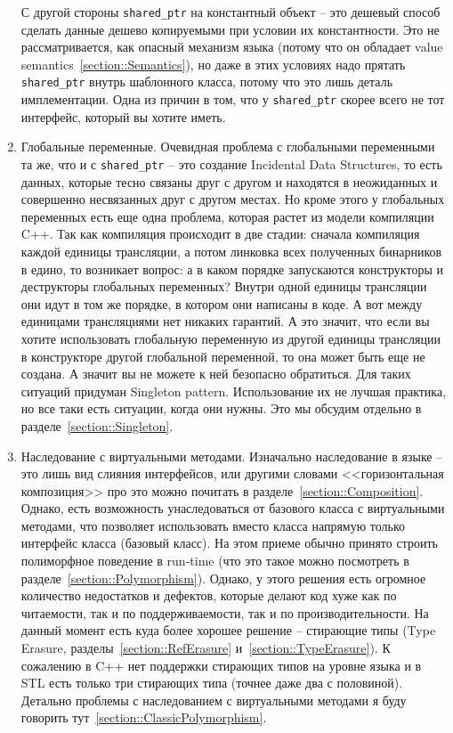 \begin{enumerate}
С другой стороны \verb"shared_ptr" на константный объект -- это дешевый способ сделать данные дешево копируемыми при условии их константности.
Это не рассматривается, как опасный механизм языка (потому что он обладает value semantics~\ref{section::Semantics}), но даже в этих условиях надо прятать \verb"shared_ptr" внутрь шаблонного класса, потому что это лишь деталь имплементации.
Одна из причин в том, что у \verb"shared_ptr" скорее всего не тот интерфейс, который вы хотите иметь.

\item Глобальные переменные.
Очевидная проблема с глобальными переменными та же, что и с \verb"shared_ptr" -- это создание Incidental Data Structures, то есть данных, которые тесно связаны друг с другом и находятся в неожиданных и совершенно несвязанных друг с другом местах.
Но кроме этого у глобальных переменных есть еще одна проблема, которая растет из модели компиляции C++.
Так как компиляция происходит в две стадии: сначала компиляция каждой единицы трансляции, а потом линковка всех полученных бинарников в едино, то возникает вопрос: а в каком порядке запускаются конструкторы и деструкторы глобальных переменных?
Внутри одной единицы трансляции они идут в том же порядке, в котором они написаны в коде.
А вот между единицами трансляциями нет никаких гарантий.
А это значит, что если вы хотите использовать глобальную переменную из другой единицы трансляции в конструкторе другой глобальной переменной, то она может быть еще не создана.
А значит вы не можете к ней безопасно обратиться.
Для таких ситуаций придуман Singleton pattern.
Использование их не лучшая практика, но все таки есть ситуации, когда они нужны.
Это мы обсудим отдельно в разделе~\ref{section::Singleton}.

\item Наследование с виртуальными методами.
Изначально наследование в языке -- это лишь вид слияния интерфейсов, или другими словами <<горизонтальная композиция>> про это можно почитать в разделе~\ref{section::Composition}.
Однако, есть возможность унаследоваться от базового класса с виртуальными методами, что позволяет использовать вместо класса напрямую только интерфейс класса (базовый класс).
На этом приеме обычно принято строить полиморфное поведение в run-time (что это такое можно посмотреть в разделе~\ref{section::Polymorphism}).
Однако, у этого решения есть огромное количество недостатков и дефектов, которые делают код хуже как по читаемости, так и по поддерживаемости, так и по производительности.
На данный момент есть куда более хорошее решение -- стирающие типы (Type Erasure, разделы~\ref{section::RefErasure} и~\ref{section::TypeErasure}).
К сожалению в C++ нет поддержки стирающих типов на уровне языка и в STL есть только три стирающих типа (точнее даже два с половиной).
Детально проблемы с наследованием с виртуальными методами я буду говорить тут~\ref{section::ClassicPolymorphism}.


\end{enumerate}
